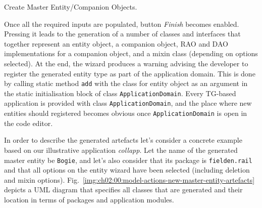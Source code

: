 \begin{image}{Create Master Entity/Companion Objects.}{\label{img:ch02:00:model-actions-new-master-entity-01}}
  \end{image}
  
  Once all the required inputs are populated, button \emph{Finish} becomes enabled.
  Pressing it leads to the generation of a number of classes and interfaces that together represent an entity object, a companion object, RAO and DAO implementations for a companion object, and a mixin class (depending on options selected).
  At the end, the wizard produces a warning advising the developer to register the generated entity type as part of the application domain.
  This is done by calling static method \texttt{add} with the class for entity object as an argument in the static initialisation block of class \texttt{ApplicationDomain}.
  Every TG-based application is provided with class \texttt{ApplicationDomain}, and the place where new entities should registered becomes obvious once \texttt{ApplicationDomain} is open in the code editor.
  
  In order to describe the generated artefacts let's consider a concrete example based on our illustrative application \emph{collapp}.
  Let the name of the generated master entity be \texttt{Bogie}, and let's also consider that its package is \texttt{fielden.rail} and that all options on the entity wizard have been selected (including deletion and mixin options).
  Fig.~\ref{img:ch02:00:model-actions-new-master-entity-artefacts} depicts a UML diagram that specifies all classes that are generated and their location in terms of packages and application modules.
  
